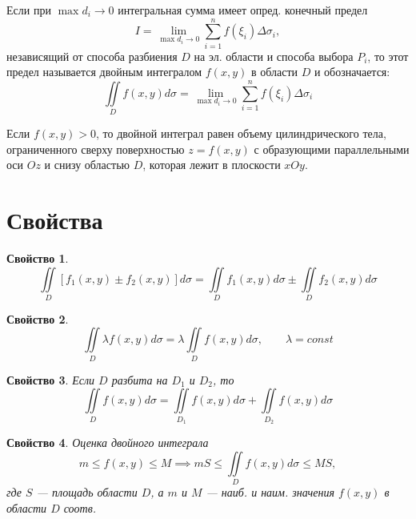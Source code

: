 \documentclass[a4paper,12pt,oneside]{extbook}
\theoremstyle{numbered}
\newtheorem{property}{Свойство}[section]
\theoremstyle{unnumbered}
\theoremstyle{named}
\theoremstyle{unnumbered}
\theoremstyle{named}
\theoremstyle{named}
\theoremstyle{named}
\begin{document}
Если при \(\max{d_i} \to 0\) интегральная сумма имеет опред. конечный предел
\begin{equation}
    I = \lim_{\max{d_i} \to 0}{\sum_{i = 1}^n f(\xi_i) \Delta \sigma_i},
\end{equation}
независящий от способа разбиения \(D\) на эл. области и способа выбора \(P_i\), то этот предел называется двойным интегралом \(f(x, y)\) в области \(D\) и обозначается:
\begin{equation}
    \iint\limits_D f(x, y) d\sigma = \lim_{\max{d_i} \to 0}{\sum_{i = 1}^n f(\xi_i) \Delta \sigma_i}
\end{equation}

Если \(f(x, y) > 0\), то двойной интеграл равен объему цилиндрического тела, ограниченного сверху поверхностью \(z = f(x, y)\) с образующими параллельными оси \(Oz\) и снизу областью \(D\), которая лежит в плоскости \(xOy\).

\section{Свойства}%
\label{sec:Свойства}

\begin{property}
    \begin{equation}
        \iint\limits_D [f_1(x, y) \pm f_2(x, y)]d\sigma = \iint\limits_D f_1(x, y)d\sigma \pm \iint\limits_D f_2(x, y)d\sigma
    \end{equation}
\end{property}

\begin{property}
    \begin{equation}
        \iint\limits_D \lambda f(x, y)d\sigma = \lambda \iint\limits_D f(x, y)d\sigma, \qquad \lambda = const
    \end{equation}
\end{property}

\begin{property}
    Если \(D\) разбита на \(D_1\) и \(D_2\), то
    \begin{equation}
        \iint\limits_D f(x, y)d\sigma = \iint\limits_{D_1} f(x, y)d\sigma + \iint\limits_{D_2} f(x, y)d\sigma
    \end{equation}
\end{property}

\begin{property}
    Оценка двойного интеграла
    \begin{equation}
        m \leq f(x, y) \leq M \implies mS \leq \iint\limits_D f(x, y)d\sigma \leq MS,
    \end{equation}
    где \(S\) — площадь области \(D\), а \(m\) и \(M\) — наиб. и наим. значения \(f(x, y)\) в области \(D\) соотв.
\end{property}
\end{document}
